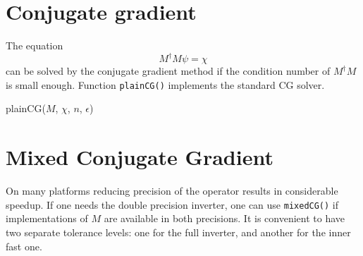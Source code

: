 \documentclass[oneside,openright]{report}
\begin{document}
\section{Conjugate gradient}
The equation
\[
   M^\dagger M \psi = \chi
\]
can be solved by the conjugate gradient method if the condition number of
 $M^\dagger M$ is small enough. Function \texttt{plainCG()} implements the standard CG solver.
\begin{function}
\DontPrintSemicolon
{}

\caption{plainCG($M$, $\chi$, $n$, $\epsilon$)}
\end{function}

\section{Mixed Conjugate Gradient}
On many platforms reducing precision of the operator results in considerable speedup. If one needs the double precision inverter, one can use \texttt{mixedCG()} if implementations of $M$ are available in both precisions. It is convenient to have two separate tolerance levels: one for the full inverter, and another for the inner fast one.
\end{document}
